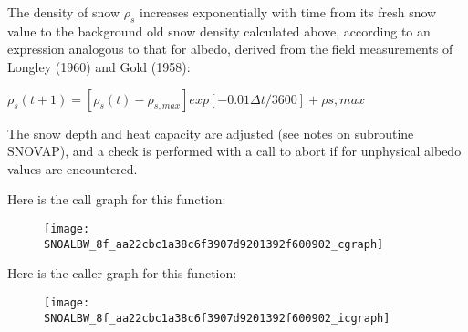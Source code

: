 The density of snow $\rho_s$ increases exponentially with time from its fresh snow value to the background old snow density calculated above, according to an expression analogous to that for albedo, derived from the field measurements of Longley (1960) and Gold (1958)\+:

$\rho_s (t+1) = [\rho_s (t) - \rho_{s,max} ] exp [-0.01 \Delta t/3600] + \rho{s,max}$

The snow depth and heat capacity are adjusted (see notes on subroutine S\+N\+O\+V\+A\+P), and a check is performed with a call to abort if for unphysical albedo values are encountered.

Here is the call graph for this function\+:\nopagebreak
\begin{figure}[H]
\begin{center}
\leavevmode
\texttt{[image: SNOALBW\_8f\_aa22cbc1a38c6f3907d9201392f600902\_cgraph]}
\end{center}
\end{figure}




Here is the caller graph for this function\+:\nopagebreak
\begin{figure}[H]
\begin{center}
\leavevmode
\texttt{[image: SNOALBW\_8f\_aa22cbc1a38c6f3907d9201392f600902\_icgraph]}
\end{center}
\end{figure}


